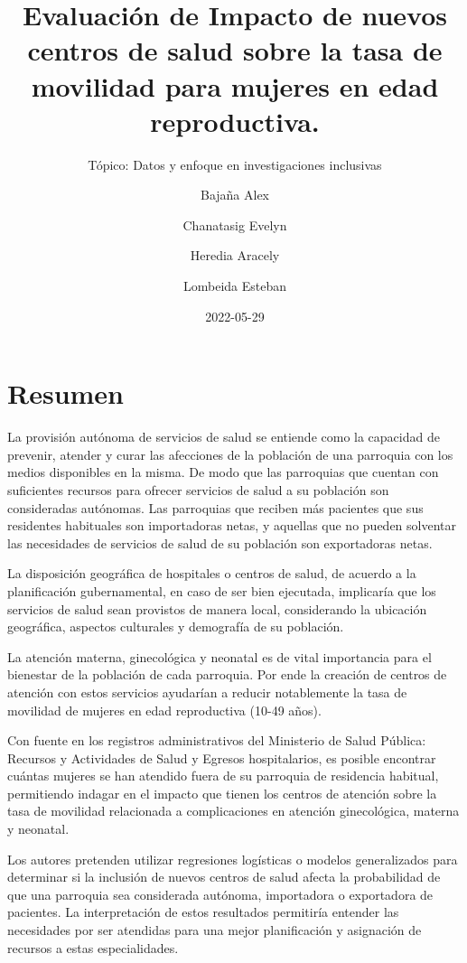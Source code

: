 \documentclass[
]{article}
\title{Evaluación de Impacto de nuevos centros de salud sobre la tasa de
movilidad para mujeres en edad reproductiva.}
\subtitle{Tópico: Datos y enfoque en investigaciones inclusivas}
\author{Bajaña Alex \and Chanatasig Evelyn \and Heredia
Aracely \and Lombeida Esteban}
\date{2022-05-29}
\begin{document}
\maketitle

{
\setcounter{tocdepth}{1}
\tableofcontents
}
\hypertarget{resumen}{%
\section{Resumen}\label{resumen}}

La provisión autónoma de servicios de salud se entiende como la
capacidad de prevenir, atender y curar las afecciones de la población de
una parroquia con los medios disponibles en la misma. De modo que las
parroquias que cuentan con suficientes recursos para ofrecer servicios
de salud a su población son consideradas autónomas. Las parroquias que
reciben más pacientes que sus residentes habituales son importadoras
netas, y aquellas que no pueden solventar las necesidades de servicios
de salud de su población son exportadoras netas.

La disposición geográfica de hospitales o centros de salud, de acuerdo a
la planificación gubernamental, en caso de ser bien ejecutada,
implicaría que los servicios de salud sean provistos de manera local,
considerando la ubicación geográfica, aspectos culturales y demografía
de su población.

La atención materna, ginecológica y neonatal es de vital importancia
para el bienestar de la población de cada parroquia. Por ende la
creación de centros de atención con estos servicios ayudarían a reducir
notablemente la tasa de movilidad de mujeres en edad reproductiva (10-49
años).

Con fuente en los registros administrativos del Ministerio de Salud
Pública: Recursos y Actividades de Salud y Egresos hospitalarios, es
posible encontrar cuántas mujeres se han atendido fuera de su parroquia
de residencia habitual, permitiendo indagar en el impacto que tienen los
centros de atención sobre la tasa de movilidad relacionada a
complicaciones en atención ginecológica, materna y neonatal.

Los autores pretenden utilizar regresiones logísticas o modelos
generalizados para determinar si la inclusión de nuevos centros de salud
afecta la probabilidad de que una parroquia sea considerada autónoma,
importadora o exportadora de pacientes. La interpretación de estos
resultados permitiría entender las necesidades por ser atendidas para
una mejor planificación y asignación de recursos a estas especialidades.
\end{document}
